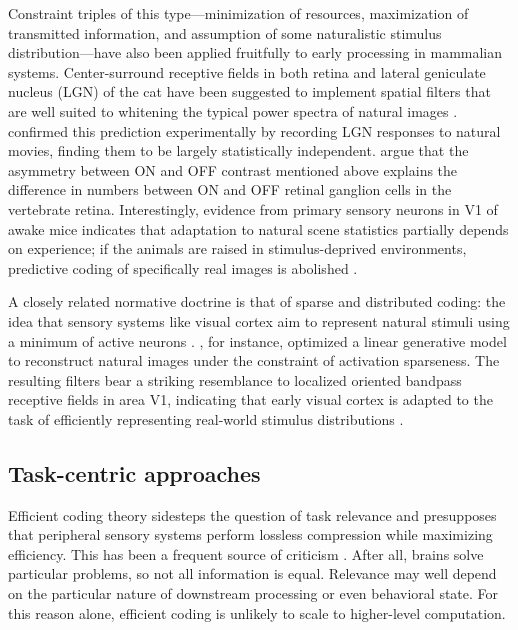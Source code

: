 Constraint triples of this type---minimization of resources, maximization of transmitted information, and assumption of some naturalistic stimulus distribution---have also been applied fruitfully to early processing in mammalian systems. Center-surround receptive fields in both retina and lateral geniculate nucleus (LGN) of the cat have been suggested to implement spatial filters that are well suited to whitening the typical power spectra of natural images \citep{vanHateren:1992aa,Atick:1992aa,vanHateren:1993aa}. \citet{Dan:1996aa} confirmed this prediction experimentally by recording LGN responses to natural movies, finding them to be largely statistically independent. \citet{Ratliff:2010kb} argue that the asymmetry between ON and OFF contrast mentioned above explains the difference in numbers between ON and OFF retinal ganglion cells in the vertebrate retina. Interestingly, evidence from primary sensory neurons in V1 of awake mice indicates that adaptation to natural scene statistics partially depends on experience; if the animals are raised in stimulus-deprived environments, predictive coding of specifically real images is abolished \citep{Pecka:2014aa}.

A closely related normative doctrine is that of sparse and distributed coding: the idea that sensory systems like visual cortex aim to represent natural stimuli using a minimum of active neurons \citep{Simoncelli:2001dn}. \citet{Ohlshausen:1996aa}, for instance, optimized a linear generative model to reconstruct natural images under the constraint of activation sparseness. The resulting filters bear a striking resemblance to localized oriented bandpass receptive fields in area V1, indicating that early visual cortex is adapted to the task of efficiently representing real-world stimulus distributions \citep[for a related method based on independent component analysis, see][]{vanHateren:1998jt,Bell:1997ve}.

\subsection{Task-centric approaches}
Efficient coding theory sidesteps the question of task relevance and presupposes that peripheral sensory systems perform lossless compression while maximizing efficiency. This has been a frequent source of criticism \citep{Simoncelli:2003aa}. After all, brains solve particular problems, so not all information is equal. Relevance may well depend on the particular nature of downstream processing or even behavioral state. For this reason alone, efficient coding is unlikely to scale to higher-level computation.

